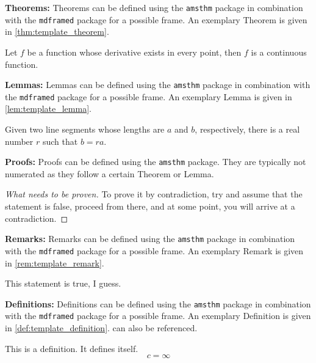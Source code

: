 \textbf{Theorems:} Theorems can be defined using the \verb+amsthm+ package in combination with the \verb+mdframed+ package for a possible frame. An exemplary Theorem is given in \autoref{thm:template_theorem}.
\begin{theoremenv}\label{thm:template_theorem}
	Let $f$ be a function whose derivative exists in every point, then $f$ is
	a continuous function.
\end{theoremenv}
\textbf{Lemmas:} Lemmas can be defined using the \verb+amsthm+ package in combination with the \verb+mdframed+ package for a possible frame. An exemplary Lemma is given in \autoref{lem:template_lemma}.
\begin{lemmaenv}
	Given two line segments whose lengths are $a$ and $b$, respectively, there is a real number $r$ such that $b=ra$.\label{lem:template_lemma}
\end{lemmaenv}
\textbf{Proofs:} Proofs can be defined using the \verb+amsthm+ package. They are typically not numerated as they follow a certain Theorem or Lemma.
\begin{proof}[What needs to be proven]
	To prove it by contradiction, try and assume that the statement is false, proceed from there, and at some point, you will arrive at a contradiction.\label{pro:template_proof}
\end{proof}
\textbf{Remarks:} Remarks can be defined using the \verb+amsthm+ package in combination with the \verb+mdframed+ package for a possible frame. An exemplary Remark is given in \autoref{rem:template_remark}.
\begin{remarkenv}\label{rem:template_remark}
	This statement is true, I guess.
\end{remarkenv}
\textbf{Definitions:} Definitions can be defined using the \verb+amsthm+ package in combination with the \verb+mdframed+ package for a possible frame. An exemplary Definition is given in \autoref{def:template_definition}.  can also be referenced.
\begin{definition}
	This is a definition. It defines itself.\label{def:template_definition}
	\begin{equation}
		c = \infty\label{eq:template_equation_in_env}
	\end{equation}
\end{definition}

